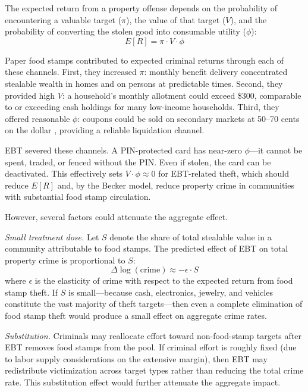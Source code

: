 \documentclass[12pt]{article}
\begin{document}
The expected return from a property offense depends on the probability of encountering a valuable target ($\pi$), the value of that target ($V$), and the probability of converting the stolen good into consumable utility ($\phi$):
\begin{equation}
E[R] = \pi \cdot V \cdot \phi
\end{equation}

Paper food stamps contributed to expected criminal returns through each of these channels. First, they increased $\pi$: monthly benefit delivery concentrated stealable wealth in homes and on persons at predictable times. Second, they provided high $V$: a household's monthly allotment could exceed \$300, comparable to or exceeding cash holdings for many low-income households. Third, they offered reasonable $\phi$: coupons could be sold on secondary markets at 50--70 cents on the dollar \citep{macaluso2003extent}, providing a reliable liquidation channel.

EBT severed these channels. A PIN-protected card has near-zero $\phi$---it cannot be spent, traded, or fenced without the PIN. Even if stolen, the card can be deactivated. This effectively sets $V \cdot \phi \approx 0$ for EBT-related theft, which should reduce $E[R]$ and, by the Becker model, reduce property crime in communities with substantial food stamp circulation.

However, several factors could attenuate the aggregate effect.

\textit{Small treatment dose.} Let $S$ denote the share of total stealable value in a community attributable to food stamps. The predicted effect of EBT on total property crime is proportional to $S$:
\begin{equation}
\Delta \log(\text{crime}) \approx -\epsilon \cdot S
\end{equation}
where $\epsilon$ is the elasticity of crime with respect to the expected return from food stamp theft. If $S$ is small---because cash, electronics, jewelry, and vehicles constitute the vast majority of theft targets---then even a complete elimination of food stamp theft would produce a small effect on aggregate crime rates.

\textit{Substitution.} Criminals may reallocate effort toward non-food-stamp targets after EBT removes food stamps from the pool. If criminal effort is roughly fixed (due to labor supply considerations on the extensive margin), then EBT may redistribute victimization across target types rather than reducing the total crime rate. This substitution effect would further attenuate the aggregate impact.
\end{document}
